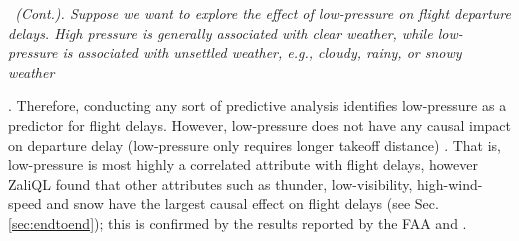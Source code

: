    \begin{example} \em \delay \ (Cont.).  \label{ex:press} \em Suppose
     we want to explore the effect of low-pressure on flight departure
     delays. High pressure is generally associated with clear weather,
     while low-pressure is associated with unsettled weather, e.g.,
     cloudy, rainy, or snowy
     weather. Therefore,
     conducting any sort of predictive analysis identifies
     low-pressure as a predictor for flight delays. However,
     low-pressure does not have any causal impact on departure delay
     (low-pressure only requires longer takeoff distance)
     \cite{FAA08}.  That is, low-pressure is most highly a correlated
     attribute with flight delays, however ZaliQL found that other
     attributes such as thunder, low-visibility, high-wind-speed and
     snow have the largest causal effect on flight delays (see
     Sec. \ref{sec:endtoend}); this is confirmed by the results
     reported by the FAA and \cite{weather}.

\end{example}







\vspace{-0.1cm}





